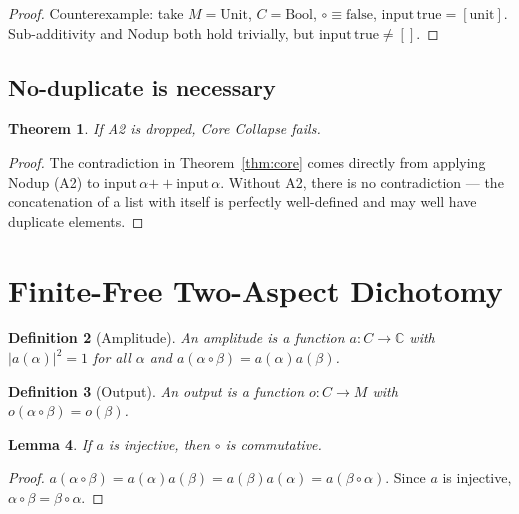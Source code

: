 ﻿\documentclass[11pt]{article}
\newtheorem{theorem}{Theorem}
\newtheorem{lemma}[theorem]{Lemma}
\newtheorem{definition}[theorem]{Definition}
\begin{document}
\begin{proof}
Counterexample: take $M = \mathrm{Unit}$, $C = \mathrm{Bool}$,
$\circ \equiv \mathrm{false}$,
$\mathrm{input}\,\mathrm{true} = [\mathrm{unit}]$.
Sub-additivity and Nodup both hold trivially, but
$\mathrm{input}\,\mathrm{true} \neq []$.
\end{proof}

\subsection{No-duplicate is necessary}

\begin{theorem}
\label{thm:nodup-necessary}
If A2 is dropped, Core Collapse fails.
\end{theorem}

\begin{proof}
The contradiction in Theorem~\ref{thm:core} comes directly
from applying Nodup (A2) to
$\mathrm{input}\,\alpha \mathbin{+\!+} \mathrm{input}\,\alpha$.
Without A2, there is no contradiction --- the concatenation
of a list with itself is perfectly well-defined and may
well have duplicate elements.
\end{proof}

\section{Finite-Free Two-Aspect Dichotomy}
\label{sec:dichotomy}

\begin{definition}[Amplitude]
An \emph{amplitude} is a function $a : C \to \mathbb{C}$
with $|a(\alpha)|^2 = 1$ for all $\alpha$ and
$a(\alpha \circ \beta) = a(\alpha) a(\beta)$.
\end{definition}

\begin{definition}[Output]
An \emph{output} is a function $o : C \to M$ with
$o(\alpha \circ \beta) = o(\beta)$.
\end{definition}

\begin{lemma}
\label{lem:comm}
If $a$ is injective, then $\circ$ is commutative.
\end{lemma}

\begin{proof}
$a(\alpha \circ \beta) = a(\alpha) a(\beta)
  = a(\beta) a(\alpha) = a(\beta \circ \alpha)$.
Since $a$ is injective, $\alpha \circ \beta = \beta \circ \alpha$.
\end{proof}
\end{document}

